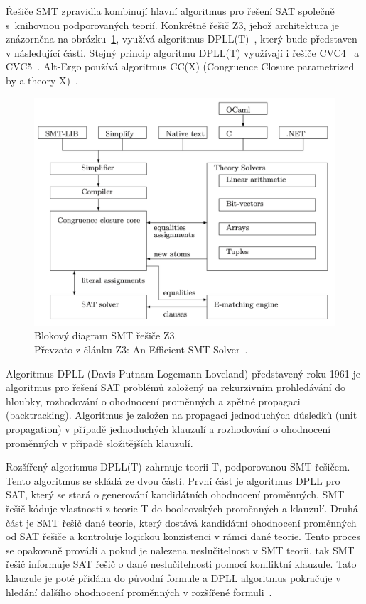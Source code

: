 Řešiče SMT zpravidla kombinují hlavní algoritmus pro řešení SAT společně
s~knihovnou podporovaných teorií.
Konkrétně řešič Z3, jehož architektura je znázorněna na obrázku~\ref{fig:z3-block-diagram}, využívá algoritmus DPLL(T)~\cite{Z3Intro},
který bude představen v následující části.
Stejný princip algoritmu DPLL(T) využívají i řešiče CVC4~\cite{cvc4_website} a CVC5~\cite{cvc5_website}.
Alt-Ergo používá algoritmus CC(X) (Congruence Closure parametrized by a theory X)~\cite{AltErgo}.

\begin{figure}[H]
    \centering
    \includegraphics[width=\linewidth]{images/smt-structure}
    \caption{
        Blokový diagram SMT řešiče Z3. \\
        Převzato z článku Z3: An Eﬃcient SMT Solver~\cite{Z3}.
    }
    \label{fig:z3-block-diagram}
\end{figure}

Algoritmus DPLL (Davis-Putnam-Logemann-Loveland) představený roku 1961
je algoritmus pro řešení SAT problémů
založený na rekurzivním prohledávání do hloubky, rozhodování o ohodnocení proměnných a zpětné propagaci (backtracking).
Algoritmus je založen na propagaci jednoduchých důsledků (unit propagation) v případě jednoduchých klauzulí
a rozhodování o ohodnocení proměnných v případě složitějších klauzulí.

Rozšířený algoritmus DPLL(T) zahrnuje teorii T, podporovanou SMT řešičem.
Tento algoritmus se skládá ze dvou částí.
První část je algoritmus DPLL pro SAT, který se stará o generování kandidátních ohodnocení proměnných.
SMT řešič kóduje vlastnosti z teorie T do booleovských proměnných a klauzulí.
Druhá část je SMT řešič dané teorie, který dostává kandidátní ohodnocení proměnných od SAT řešiče a kontroluje logickou konzistenci
v rámci dané teorie.
Tento proces se opakovaně provádí a pokud je nalezena neslučitelnost v SMT teorii,
tak SMT řešič informuje SAT řešič o dané neslučitelnosti pomocí konfliktní klauzule.
Tato klauzule je poté přidána do původní formule a DPLL algoritmus pokračuje v hledání dalšího ohodnocení proměnných
v rozšířené formuli~\cite{DPLLT}.

